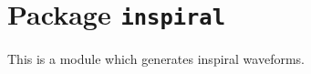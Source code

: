 \chapter{Package \texttt{inspiral}}

This is a module which generates inspiral waveforms.
 
\newpage
